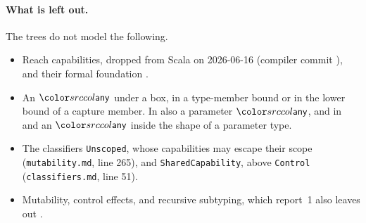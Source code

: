 \paragraph{What is left out.}
The trees do not model the following.
\begin{itemize}
\item Reach capabilities, dropped from Scala on 2026-06-16 (compiler commit ), and their formal foundation \cite{xu2024reach}.
\item An $\cany$ under a box, in a type-member bound or in the lower bound of a capture member. In \treeK also a parameter $\cany$, and in \treeCC and \treeCL an $\cany$ inside the shape of a parameter type.
\item The classifiers \lstinline{Unscoped}, whose capabilities may escape their scope (\texttt{mutability.md}, line 265), and \lstinline{SharedCapability}, above \lstinline{Control} (\texttt{classifiers.md}, line 51).
\item Mutability, control effects, and recursive subtyping, which report~1 also leaves out \cite{rompf2016soundness}.
\end{itemize}
